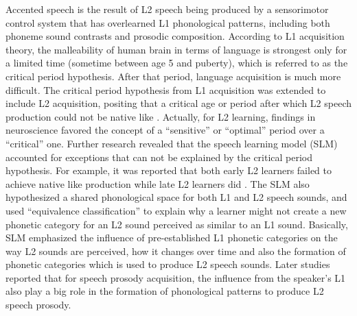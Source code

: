 Accented speech is the result of L2 speech being produced by a sensorimotor control system that has overlearned L1 phonological patterns, including both phoneme sound contrasts and prosodic composition. According to L1 acquisition theory, the malleability of human brain in terms of language is strongest only for a limited time (sometime between age 5 and puberty), which is referred to as the critical period hypothesis. After that period, language acquisition is much more difficult. The critical period hypothesis from L1 acquisition was extended to include L2 acquisition, positing that a critical age or period after which L2 speech production could not be native like \citep{long1990maturational}. Actually, for L2 learning, findings in neuroscience favored the concept of a ``sensitive'' or ``optimal'' period over a ``critical'' one. Further research revealed that the speech learning model (SLM) accounted for exceptions that can not be explained by the critical period hypothesis. For example, it was reported that both early L2 learners failed to achieve native like production while late L2 learners did \citep{flege1995second}. The SLM also hypothesized a shared phonological space for both L1 and L2 speech sounds, and used ``equivalence classification'' to explain why a learner might not create a new phonetic category for an L2 sound perceived as similar to an L1 sound. Basically, SLM emphasized the influence of pre-established L1 phonetic categories on the way L2 sounds are perceived, how it changes over time and also the formation of phonetic categories which is used to produce L2 speech sounds. Later studies reported that for speech prosody acquisition, the influence from the speaker's L1 also play a big role in the formation of phonological patterns to produce L2 speech prosody.

